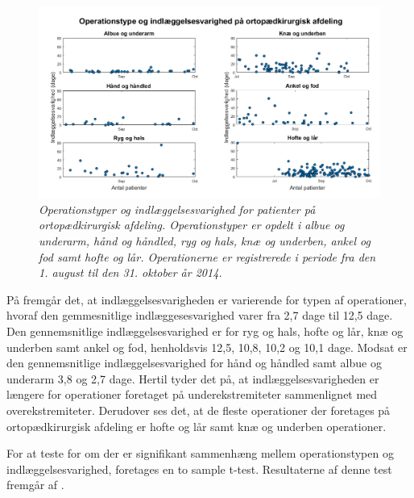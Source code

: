 \begin{figure}[H]
	\centering
	\includegraphics[scale=0.5]{figures/operaogindlaeg}
	\caption{\textit{Operationstyper og indlæggelsesvarighed for patienter på ortopædkirurgisk afdeling. Operationstyper er opdelt i albue og underarm, hånd og håndled, ryg og hals, knæ og underben, ankel og fod samt hofte og lår. Operationerne er registrerede i periode fra den 1. august til den 31. oktober år 2014.}}
	\label{opvsindlaegtid}
\end{figure}


\noindent
På  fremgår det, at indlæggelsesvarigheden er varierende for typen af operationer, hvoraf den gemmesnitlige indlæggesesvarighed varer fra 2,7 dage til 12,5 dage. Den gennemsnitlige indlæggelsesvarighed er for ryg og hals, hofte og lår, knæ og underben samt ankel og fod, henholdsvis 12,5, 10,8, 10,2 og 10,1 dage. Modsat er den gennemsnitlige indlæggelsesvarighed for hånd og håndled samt albue og underarm 3,8 og 2,7 dage. Hertil tyder det på, at indlæggelsesvarigheden er længere for operationer foretaget på underekstremiteter sammenlignet med overekstremiteter. Derudover ses det, at de fleste operationer der foretages på ortopædkirurgisk afdeling er hofte og lår samt knæ og underben operationer. 

For at teste for om der er signifikant sammenhæng mellem operationstypen og indlæggelsesvarighed, foretages en to sample t-test. Resultaterne af denne test fremgår af .

